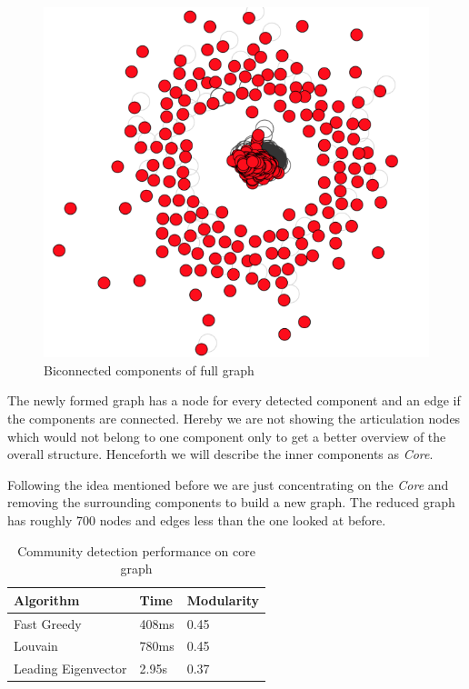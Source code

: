 \documentclass[sigconf]{acmart}
\begin{document}
\begin{figure}[h]
    \includegraphics[width=\textwidth / 2]{images/biconnected.png}
    \caption{Biconnected components of full graph}
    \label{fig:biconnected}
\end{figure}

The newly formed graph has a node for every detected component and an edge if the components are connected.
Hereby we are not showing the articulation nodes which would not belong to one component only to get a better overview of the overall structure.
Henceforth we will describe the inner components as \textit{Core}. 

Following the idea mentioned before we are just concentrating on the \textit{Core} and removing the surrounding components to build a new graph.
The reduced graph has roughly 700 nodes and edges less than the one looked at before.

\begin{table}[h]
\centering
\begin{tabular}{l|l|l}
Algorithm           & Time & Modularity \\ \hline
Fast Greedy         & 408ms   & 0.45       \\ \hline
Louvain             & 780ms & 0.45     \\ \hline
Leading Eigenvector & 2.95s & 0.37      
\end{tabular}
\caption{Community detection performance on core graph}
\label{core_comm}
\end{table}
\end{document}
